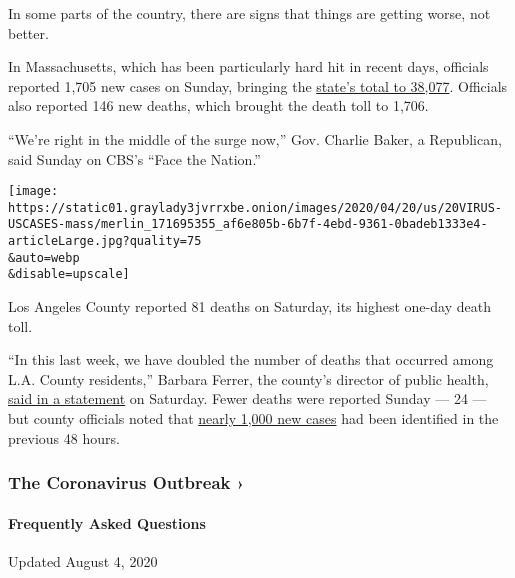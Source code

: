 In some parts of the country, there are signs that things are getting
worse, not better.

In Massachusetts, which has been particularly hard hit in recent days,
officials reported 1,705 new cases on Sunday, bringing the
\href{https://www.nytimes3xbfgragh.onion/interactive/2020/us/massachusetts-coronavirus-cases.html}{state's
total to 38,077}. Officials also reported 146 new deaths, which brought
the death toll to 1,706.

``We're right in the middle of the surge now,'' Gov. Charlie Baker, a
Republican, said Sunday on CBS's ``Face the Nation.''

\texttt{[image: https://static01.graylady3jvrrxbe.onion/images/2020/04/20/us/20VIRUS-USCASES-mass/merlin\_171695355\_af6e805b-6b7f-4ebd-9361-0badeb1333e4-articleLarge.jpg?quality=75\\\&auto=webp\\\&disable=upscale]}

Los Angeles County reported 81 deaths on Saturday, its highest one-day
death toll.

``In this last week, we have doubled the number of deaths that occurred
among L.A. County residents,'' Barbara Ferrer, the county's director of
public health,
\href{http://publichealth.lacounty.gov/phcommon/public/media/mediapubhpdetail.cfm?prid=2325}{said
in a statement} on Saturday. Fewer deaths were reported Sunday --- 24
--- but county officials noted that
\href{http://publichealth.lacounty.gov/phcommon/public/media/mediapubhpdetail.cfm?prid=2326}{nearly
1,000 new cases} had been identified in the previous 48 hours.

\href{https://www.nytimes3xbfgragh.onion/news-event/coronavirus?action=click\&pgtype=Article\&state=default\&region=MAIN_CONTENT_3\&context=storylines_faq}{}

\hypertarget{the-coronavirus-outbreak-}{%
\subsubsection{The Coronavirus Outbreak
›}\label{the-coronavirus-outbreak-}}

\hypertarget{frequently-asked-questions}{%
\paragraph{Frequently Asked
Questions}\label{frequently-asked-questions}}

Updated August 4, 2020

